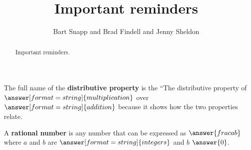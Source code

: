 \documentclass[nooutcomes]{ximera}
\title{Important reminders}
\author{Bart Snapp and Brad Findell and Jenny Sheldon}
\begin{document}
\begin{abstract}
Important reminders.
\end{abstract}
\maketitle


%

\begin{problem}
The full name of the \textbf{distributive property} is the ``The distributive property of $\answer[format=string]{multiplication}$ over $\answer[format=string]{addition}$ because it shows how the two properties relate. 
\end{problem}

\begin{problem}
A \textbf{rational number} is any number that can be expressed as $\answer{frac{a}{b}}$ where $a$ and $b$ are $\answer[format=string]{integers}$ and $b$ \wordChoice{\choice{$=$} \choice{$<$} \choice{$>$} \choice[correct]{$\ne$}} $\answer{0}$.
\end{problem}
\end{document}
